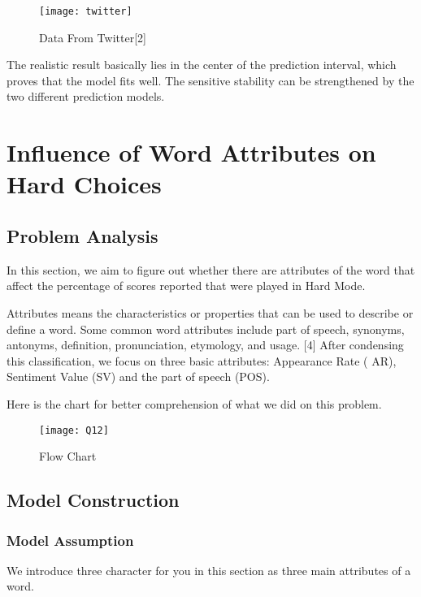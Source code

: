 \documentclass{mcmthesis}
\begin{document}
\begin{figure}[h]
\small
\centering
\texttt{[image: twitter]}
\caption{Data From Twitter[2]} \label{fig:aa}
\end{figure}
The realistic result basically lies in the center of the prediction interval, which proves that the model fits well. The sensitive stability can be strengthened by the two different prediction models.



\section{Influence of Word Attributes on Hard Choices}
\subsection{Problem Analysis}

\hspace*{0.6cm}In this section, we aim to figure out whether there are attributes of the word that affect the percentage of scores reported that were played in Hard Mode.
 
Attributes means the characteristics or properties that can be used to describe or define a word. Some common word attributes include part of speech, synonyms, antonyms, definition, pronunciation, etymology, and usage. [4] After condensing this classification, we focus on three basic attributes: Appearance Rate ( AR), Sentiment Value (SV) and the part of speech (POS).

Here is the chart for better comprehension of what we did on this problem.

\begin{figure}[h]
\small
\centering
\texttt{[image: Q12]}
\caption{Flow Chart} \label{fig:aa}
\end{figure}

\subsection{Model Construction}
\subsubsection{Model Assumption}
\hspace*{0.6cm}We introduce three character for you in this section as three main attributes of a word. 
\end{document}
